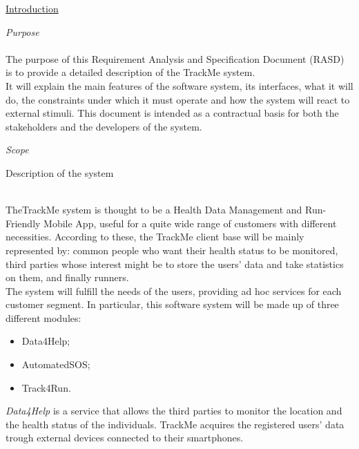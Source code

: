 \documentclass{article}
\begin{document}
\newpage
	\begin{legal}\bfseries
 	\item \underline{Introduction} 
  		\begin{legal}
    		\item \textit{Purpose}\\
		\\
		{\normalfont
		The purpose of this Requirement Analysis and Specification Document (RASD) is to provide a detailed description of the TrackMe system.\\ 
		It will explain the main features of the software system, its interfaces, what it will do, the constraints under which it must operate and how the system will react to external stimuli. This document is intended as a contractual basis for both the stakeholders and the developers of the system.
		}\\
		\item \textit{Scope}\\
			\begin{legal}
    		\item Description of the system \\\\
			{\normalfont
TheTrackMe system is thought to be a Health Data Management and Run-Friendly Mobile App, useful for a quite wide range of customers with different necessities. According to these, the TrackMe client base will be mainly represented by: common people who want their health status to be monitored, third parties whose interest might be to store the users' data and take statistics on them, and finally runners.\\ The system will fulfill the needs of the users, providing ad hoc services for each customer segment. In particular, this software system will be  made up of three different modules:\\
		\begin{itemize}
		\item Data4Help;\\
		\item AutomatedSOS;\\
		\item Track4Run.\\
		\end{itemize}
\textit {Data4Help} is a service that allows the third parties to monitor the location and the health status of the individuals. TrackMe acquires the registered users' data trough external devices connected to their smartphones.\\
}
\end{legal}
\end{legal}
\end{legal}
\end{document}
